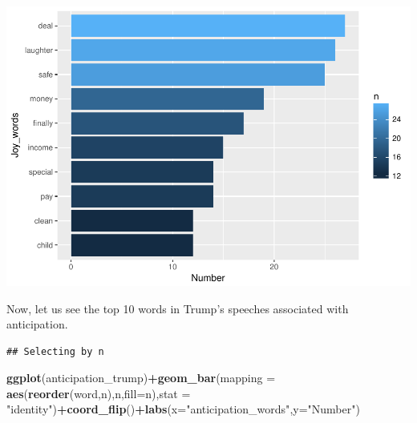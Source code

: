 \documentclass[]{article}
\newenvironment{Shaded}{\begin{snugshade}}{\end{snugshade}}
\newcommand{\KeywordTok}[1]{\textcolor[rgb]{0.13,0.29,0.53}{\textbf{#1}}}
\newcommand{\DataTypeTok}[1]{\textcolor[rgb]{0.13,0.29,0.53}{#1}}
\newcommand{\DecValTok}[1]{\textcolor[rgb]{0.00,0.00,0.81}{#1}}
\newcommand{\StringTok}[1]{\textcolor[rgb]{0.31,0.60,0.02}{#1}}
\newcommand{\OperatorTok}[1]{\textcolor[rgb]{0.81,0.36,0.00}{\textbf{#1}}}
\newcommand{\NormalTok}[1]{#1}
\begin{document}
\includegraphics{Donald_Trump_Speech_sentiment_analysis_files/figure-latex/unnamed-chunk-38-1.pdf}

Now, let us see the top 10 words in Trump's speeches associated with
anticipation.

\begin{Shaded}
\end{Shaded}

\begin{verbatim}
## Selecting by n
\end{verbatim}

\begin{Shaded}
\begin{Highlighting}[]
\KeywordTok{ggplot}\NormalTok{(anticipation_trump)}\OperatorTok{+}\KeywordTok{geom_bar}\NormalTok{(}\DataTypeTok{mapping =} \KeywordTok{aes}\NormalTok{(}\KeywordTok{reorder}\NormalTok{(word,n),n,}\DataTypeTok{fill=}\NormalTok{n),}\DataTypeTok{stat =} \StringTok{"identity"}\NormalTok{)}\OperatorTok{+}\KeywordTok{coord_flip}\NormalTok{()}\OperatorTok{+}\KeywordTok{labs}\NormalTok{(}\DataTypeTok{x=}\StringTok{"anticipation_words"}\NormalTok{,}\DataTypeTok{y=}\StringTok{"Number"}\NormalTok{)}
\end{Highlighting}
\end{Shaded}
\end{document}
